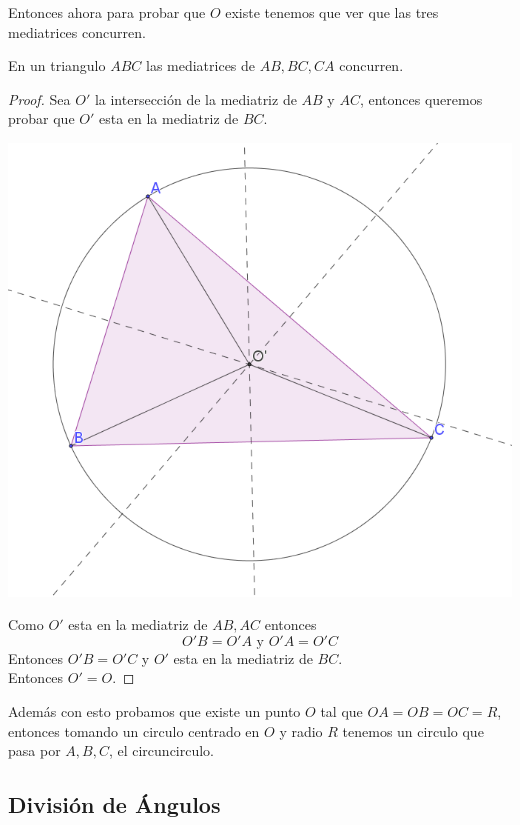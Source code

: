 \documentclass[11pt]{scrartcl}
\begin{document}
Entonces ahora para probar que $O$ existe tenemos que ver que las tres mediatrices concurren.

\begin{claim}
    En un triangulo $ABC$ las mediatrices de $AB,BC,CA$ concurren.
\end{claim}

\begin{proof}
    Sea $O'$ la intersecci\'on de la mediatriz de $AB$ y $AC$, entonces queremos probar que $O'$ esta en la mediatriz de $BC$.

      \begin{center}
        \includegraphics[scale=0.6]{PNAC5.png}
    \end{center}

    Como $O'$ esta en la mediatriz de $AB,AC$ entonces 
    \[O'B=O'A \text{ y } O'A=O'C\]
    Entonces $O'B=O'C$ y $O'$ esta en la mediatriz de $BC$. \\

    Entonces $O'=O$.
\end{proof}

Adem\'as con esto probamos que existe un punto $O$ tal que $OA=OB=OC=R$, entonces tomando un circulo centrado en $O$ y radio $R$ tenemos 
un circulo que pasa por $A,B,C$, el circuncirculo. \\


\subsection{Divisi\'on de \'Angulos}
\end{document}
